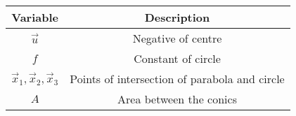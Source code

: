\begin{tabular}[12pt]{ |c| c|}
    \hline
    \textbf{Variable} & \textbf{Description}\\ 
    \hline
    $\vec{u}$ & Negative of centre \\
    \hline 
    $f$ & Constant of circle \\
    \hline
    $\vec{x}_1, \vec{x}_2, \vec{x}_3$ & Points of intersection of parabola and circle \\
    \hline
     $A$ & Area between the conics \\
    \hline
\end{tabular}
